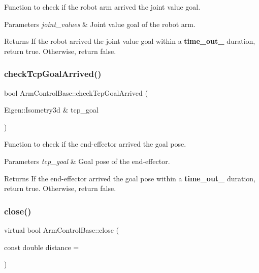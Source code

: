 Function to check if the robot arm arrived the joint value goal. 


\begin{DoxyParams}{Parameters}
{\em joint\+\_\+values} & Joint value goal of the robot arm. \\
\hline
\end{DoxyParams}
\begin{DoxyReturn}{Returns}
If the robot arrived the joint value goal within a {\bfseries time\+\_\+out\+\_\+} duration, return true. Otherwise, return false. 
\end{DoxyReturn}
\mbox{\label{classArmControlBase_a377f3ff5a7510e24c750db4878780dc4}} 
\subsubsection{\texorpdfstring{check\+Tcp\+Goal\+Arrived()}{checkTcpGoalArrived()}}
{\footnotesize\ttfamily bool Arm\+Control\+Base\+::check\+Tcp\+Goal\+Arrived (\begin{DoxyParamCaption}\item[{Eigen\+::\+Isometry3d \&}]{tcp\+\_\+goal }\end{DoxyParamCaption})\hspace{0.3cm}{\ttfamily [virtual]}}



Function to check if the end-\/effector arrived the goal pose. 


\begin{DoxyParams}{Parameters}
{\em tcp\+\_\+goal} & Goal pose of the end-\/effector. \\
\hline
\end{DoxyParams}
\begin{DoxyReturn}{Returns}
If the end-\/effector arrived the goal pose within a {\bfseries time\+\_\+out\+\_\+} duration, return true. Otherwise, return false. 
\end{DoxyReturn}
\mbox{\label{classArmControlBase_a7d767299ad4e2e087a89d911b93467c0}} 
\subsubsection{\texorpdfstring{close()}{close()}}
{\footnotesize\ttfamily virtual bool Arm\+Control\+Base\+::close (\begin{DoxyParamCaption}\item[{const double}]{distance = {} }\end{DoxyParamCaption})\hspace{0.3cm}{\ttfamily [pure virtual]}}



